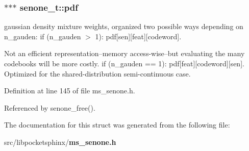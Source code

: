 \subsubsection[{pdf}]{$\ast$$\ast$$\ast$ senone\-\_\-t\-::pdf}\label{structsenone__t_aa7e23dc8a18875bad1c1b9c322f3cad4}


gaussian density mixture weights, organized two possible ways depending on n\-\_\-gauden\-: if (n\-\_\-gauden $>$ 1)\-: pdf[sen][feat][codeword]. 

Not an efficient representation--memory access-\/wise--but evaluating the many codebooks will be more costly. if (n\-\_\-gauden == 1)\-: pdf[feat][codeword][sen]. Optimized for the shared-\/distribution semi-\/continuous case. 

Definition at line 145 of file ms\-\_\-senone.\-h.



Referenced by senone\-\_\-free().



The documentation for this struct was generated from the following file\-:\begin{DoxyCompactItemize}
\item 
src/libpocketsphinx/{\bf ms\-\_\-senone.\-h}\end{DoxyCompactItemize}
